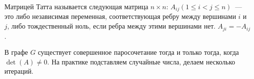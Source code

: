 Матрицей Татта называется следующая матрица $n \times n$: $A_{ij} (1 \le i < j \le n)$~--- это либо независимая переменная, соответствующая ребру между вершинами $i$ и $j$, либо тождественный ноль, если ребра между этими вершинами нет. $A_{ji} = -A_{ij}$ .

В графе $G$ существует совершенное паросочетание тогда и только тогда, когда $\det(A) \neq  0$. На практике подставляем случайные числа, делаем несколько итераций.